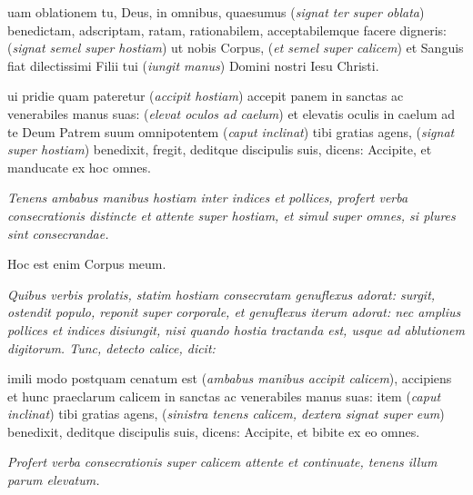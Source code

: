 uam oblationem tu, Deus, in omnibus, quaesumus (\textit{signat ter
super oblata}) bene\cross{}dictam, adscrip\cross{}tam, ra\cross{}tam,
rationabilem, acceptabilemque facere digneris: (\textit{signat semel super
hostiam}) ut nobis Cor\cross{}pus, (\textit{et semel super calicem}) et
San\cross{}guis fiat dilectissimi Filii tui (\textit{iungit manus}) Domini
nostri Iesu Christi.

ui pridie quam pateretur (\textit{accipit hostiam}) accepit panem
in sanctas ac venerabiles manus suas: (\textit{elevat oculos ad caelum}) et
elevatis oculis in caelum ad te Deum Patrem suum omnipotentem (\textit{caput
inclinat}) tibi gratias agens, (\textit{signat super hostiam})
bene\cross{}dixit, fregit, deditque discipulis suis, dicens: Accipite, et
manducate ex hoc omnes.

\textit{%
    Tenens ambabus manibus hostiam inter indices et pollices, profert verba
    consecrationis distincte et attente super hostiam, et simul super omnes, si
    plures sint consecrandae.
}

\vspace{\baselineskip}


\vspace{0.5\baselineskip}

{\Large\centering Hoc est enim Corpus meum.\par}

\vspace{0.5\baselineskip}

\sinus\sinus\sinus

\vspace{\baselineskip}

\textit{%
    Quibus verbis prolatis, statim hostiam consecratam genuflexus adorat:
    surgit, ostendit populo, reponit super corporale, et genuflexus iterum
    adorat: nec amplius pollices et indices disiungit, nisi quando hostia
    tractanda est, usque ad ablutionem digitorum.  Tunc, detecto calice, dicit:
}

imili modo postquam cenatum est (\textit{ambabus manibus accipit
calicem}), accipiens et hunc praeclarum calicem in sanctas ac venerabiles manus
suas: item (\textit{caput inclinat}) tibi gratias agens, (\textit{sinistra
tenens calicem, dextera signat super eum}) bene\cross{}dixit, deditque
discipulis suis, dicens: Accipite, et bibite ex eo omnes.

\textit{%
    Profert verba consecrationis super calicem attente et continuate, tenens
    illum parum elevatum.
}

